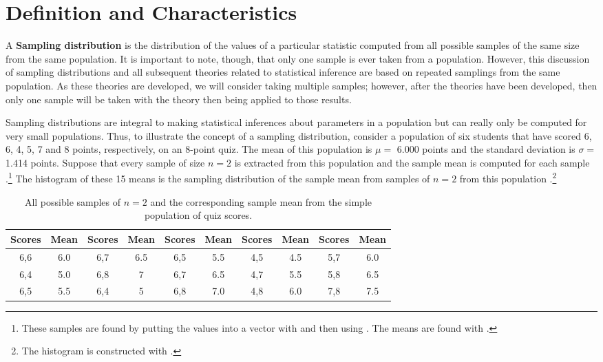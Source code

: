 \documentclass[10pt,openany]{book}\usepackage[]{graphicx}\usepackage[]{color}
\begin{document}


\section{Definition and Characteristics}  \label{sec:SDistDefn}
A \textbf{Sampling distribution} is the distribution of the values of a particular statistic computed from all possible samples of the same size from the same population.  It is important to note, though, that only one sample is ever taken from a population.  However, this discussion of sampling distributions and all subsequent theories related to statistical inference are based on repeated samplings from the same population.  As these theories are developed, we will consider taking multiple samples; however, after the theories have been developed, then only one sample will be taken with the theory then being applied to those results.




Sampling distributions are integral to making statistical inferences about parameters in a population but can really only be computed for very small populations.  Thus, to illustrate the concept of a sampling distribution, consider a population of six students that have scored 6, 6, 4, 5, 7 and 8 points, respectively, on an 8-point quiz.  The mean of this population is $\mu=$ 6.000 points and the standard deviation is $\sigma=$ 1.414 points.  Suppose that every sample of size $n=2$ is extracted from this population and the sample mean is computed for each sample .\footnote{These samples are found by putting the values into a vector with  and then using .  The means are found with .}  The histogram of these 15 means is the sampling distribution of the sample mean from samples of $n=2$ from this population .\footnote{The histogram is constructed with .}

\begin{table}[htbp]
  \caption{All possible samples of $n=2$ and the corresponding sample mean from the simple population of quiz scores.}
  \label{tab:SDistQuiz2}
  \centering
    \begin{tabular}{cc||cc||cc||cc||cc}
\hline\hline
Scores & Mean & Scores & Mean & Scores &  Mean & Scores & Mean & Scores & Mean \\
\hline
6,6 & 6.0 & 6,7 & 6.5 & 6,5 & 5.5 & 4,5 & 4.5 & 5,7 & 6.0 \\
6,4 & 5.0 & 6,8 & 7 & 6,7 & 6.5 & 4,7 & 5.5 & 5,8 & 6.5 \\
6,5 & 5.5 & 6,4 & 5 & 6,8 & 7.0 & 4,8 & 6.0 & 7,8 & 7.5 \\
\hline\hline
    \end{tabular}
\end{table}
\end{document}
